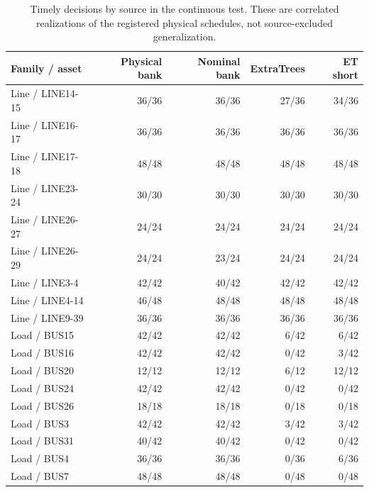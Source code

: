 \begin{table}[t]\centering\small
\caption{Timely decisions by source in the continuous test. These are correlated realizations of the registered physical schedules, not source-excluded generalization.}
\label{tab:review_sources}
\begin{tabular}{lrrrr}\toprule
Family / asset & Physical bank & Nominal bank & ExtraTrees & ET short\\\midrule
Line / LINE14-15 & 36/36 & 36/36 & 27/36 & 34/36\\
Line / LINE16-17 & 36/36 & 36/36 & 36/36 & 36/36\\
Line / LINE17-18 & 48/48 & 48/48 & 48/48 & 48/48\\
Line / LINE23-24 & 30/30 & 30/30 & 30/30 & 30/30\\
Line / LINE26-27 & 24/24 & 24/24 & 24/24 & 24/24\\
Line / LINE26-29 & 24/24 & 23/24 & 24/24 & 24/24\\
Line / LINE3-4 & 42/42 & 40/42 & 42/42 & 42/42\\
Line / LINE4-14 & 46/48 & 48/48 & 48/48 & 48/48\\
Line / LINE9-39 & 36/36 & 36/36 & 36/36 & 36/36\\
Load / BUS15 & 42/42 & 42/42 & 6/42 & 6/42\\
Load / BUS16 & 42/42 & 42/42 & 0/42 & 3/42\\
Load / BUS20 & 12/12 & 12/12 & 6/12 & 12/12\\
Load / BUS24 & 42/42 & 42/42 & 0/42 & 0/42\\
Load / BUS26 & 18/18 & 18/18 & 0/18 & 0/18\\
Load / BUS3 & 42/42 & 42/42 & 3/42 & 3/42\\
Load / BUS31 & 40/42 & 40/42 & 0/42 & 0/42\\
Load / BUS4 & 36/36 & 36/36 & 0/36 & 6/36\\
Load / BUS7 & 48/48 & 48/48 & 0/48 & 0/48\\
\bottomrule\end{tabular}
\end{table}
